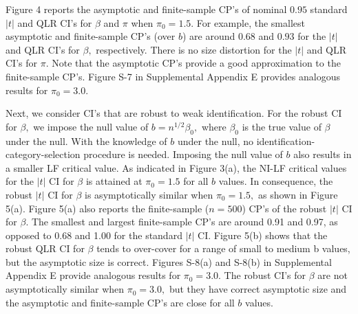 \documentclass[12pt,titlepage,final,oneside,letterpaper]{article}
\begin{document}
Figure 4 reports the asymptotic and finite-sample CP's of nominal $0.95$
standard $|t|$ and QLR CI's for $\beta $ and $\pi $ when $\pi _{0}=1.5.$ For
example, the smallest asymptotic and finite-sample CP's (over $b$) are
around $0.68$ and $0.93$ for the $|t|$ and QLR CI's for $\beta ,$
respectively. There is no size distortion for the $|t|$ and QLR CI's for $%
\pi .$ Note that the asymptotic CP's provide a good approximation to the
finite-sample CP's. Figure S-7 in Supplemental Appendix E provides analogous
results for $\pi _{0}=3.0.$


Next, we consider CI's that are robust to weak identification. For the
robust CI for $\beta ,$ we impose the null value of $b=n^{1/2}\beta _{0},$
where $\beta _{0}$ is the true value of $\beta $ under the null. With the
knowledge of $b$ under the null, no identification-category-selection
procedure is needed. Imposing the null value of $b$ also results in a
smaller LF critical value. As indicated in Figure 3(a), the NI-LF critical
values for the $|t|$ CI for $\beta $ is attained at $\pi _{0}=1.5$ for all $%
b $ values. In consequence, the robust $|t|$ CI for $\beta $ is
asymptotically similar when $\pi _{0}=1.5,$ as shown in Figure 5(a). Figure
5(a) also reports the finite-sample ($n=500$) CP's of the robust $|t|$ CI
for $\beta .$ The smallest and largest finite-sample CP's are around 0.91
and 0.97, as opposed to 0.68 and 1.00 for the standard $|t|$ CI. Figure 5(b)
shows that the robust QLR CI for $\beta $ tends to over-cover for a range of
small to medium b values, but the asymptotic size is correct. Figures S-8(a)
and S-8(b) in Supplemental Appendix E provide analogous results for $\pi
_{0}=3.0.$ The robust CI's for $\beta $ are not asymptotically similar when $%
\pi _{0}=3.0,$ but they have correct asymptotic size and the asymptotic and
finite-sample CP's are close for all $b$ values.
\end{document}
